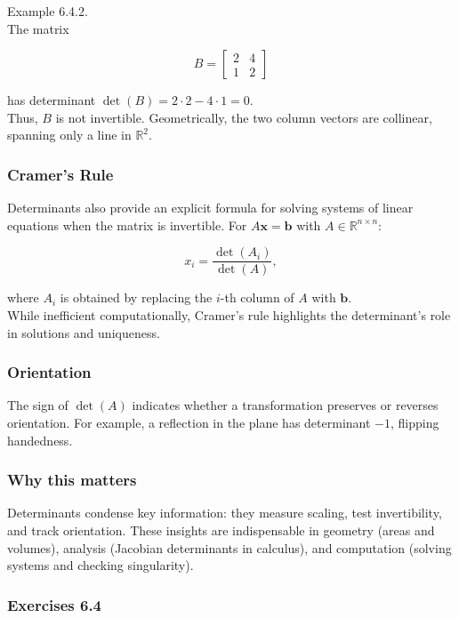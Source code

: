 \documentclass[
  12pt,
  a4paper,
]{article}
\begin{document}
Example 6.4.2.\\
The matrix

\[B = \begin{bmatrix} 2 & 4 \\ 1 & 2 \end{bmatrix}\]

has determinant \(\det(B) = 2 \cdot 2 - 4 \cdot 1 = 0\).\\
Thus, \(B\) is not invertible. Geometrically, the two column vectors are
collinear, spanning only a line in \(\mathbb{R}^2\).

\subsubsection{Cramer's Rule}\label{cramers-rule}

Determinants also provide an explicit formula for solving systems of
linear equations when the matrix is invertible. For
\(A\mathbf{x} = \mathbf{b}\) with \(A \in \mathbb{R}^{n \times n}\):

\[x_i = \frac{\det(A_i)}{\det(A)},\]

where \(A_i\) is obtained by replacing the \(i\)-th column of \(A\) with
\(\mathbf{b}\).\\
While inefficient computationally, Cramer's rule highlights the
determinant's role in solutions and uniqueness.

\subsubsection{Orientation}\label{orientation}

The sign of \(\det(A)\) indicates whether a transformation preserves or
reverses orientation. For example, a reflection in the plane has
determinant \(-1\), flipping handedness.

\subsubsection{Why this matters}\label{why-this-matters-23}

Determinants condense key information: they measure scaling, test
invertibility, and track orientation. These insights are indispensable
in geometry (areas and volumes), analysis (Jacobian determinants in
calculus), and computation (solving systems and checking singularity).

\subsubsection{Exercises 6.4}\label{exercises-64}
\end{document}
